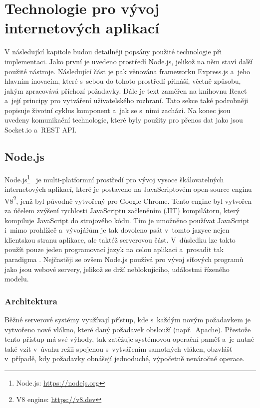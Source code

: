 \chapter{Technologie pro vývoj internetových aplikací}
\label{kap:technologie}
V následující kapitole budou detailněji popsány použité technologie při implementaci. Jako první je uvedeno prostředí Node.js, jelikož na něm staví další použité nástroje. Následující část je pak věnována frameworku Express.js a~jeho hlavním inovacím, které s~sebou do tohoto prostředí přináší, včetně způsobu, jakým zpracovává příchozí požadavky. Dále je text zaměřen na knihovnu React a~její principy pro vytváření uživatelského rozhraní. Tato sekce také podrobněji popisuje životní cyklus komponent a~jak se s~nimi zachází. Na konec jsou uvedeny komunikační technologie, které byly použity pro přenos dat jako jsou Socket.io a~REST API.

\section{Node.js}
\label{sec:Node}
Node.js\footnote{Node.js: \url{https://nodejs.org}}~\cite{book:NodeJS-WebDevelopment, book:LearningNode} je multi-platformní prostředí pro vývoj vysoce škálovatelných internetových aplikací, které je postaveno na JavaScriptovém open-source enginu V8\footnote{V8 engine: \url{https://v8.dev}}, jenž byl původně vytvořený pro Google Chrome. Tento engine byl vytvořen za účelem zvýšení rychlosti JavaScriptu začleněním \emph{} (JIT) kompilátoru, který kompiluje JavaScript do strojového kódu. Tím je umožněno používat JavaScript i~mimo prohlížeč a~vývojářům je tak dovoleno psát v~tomto jazyce nejen klientskou stranu aplikace, ale taktéž serverovou část. V~důsledku lze takto použít pouze jeden programovací jazyk na celou aplikaci a~prosadit tak paradigma \emph{}. Nejčastěji se ovšem Node.js používá pro vývoj síťových programů jako jsou webové servery, jelikož se drží neblokujícího, událostmi řízeného modelu.

\subsection{Architektura}
Běžné serverové systémy využívají \emph{} přístup, kde s~každým novým požadavkem je vytvořeno nové vlákno, které daný požadavek obslouží (např.~Apache). Přestože tento přístup má své výhody, tak zatěžuje systémovou operační paměť a~je nutné také vzít v~úvahu režii spojenou s~vytvářením samotných vláken, obzvlášť v~případě, kdy požadavky obnášejí jednoduché, výpočetně nenáročné operace.

